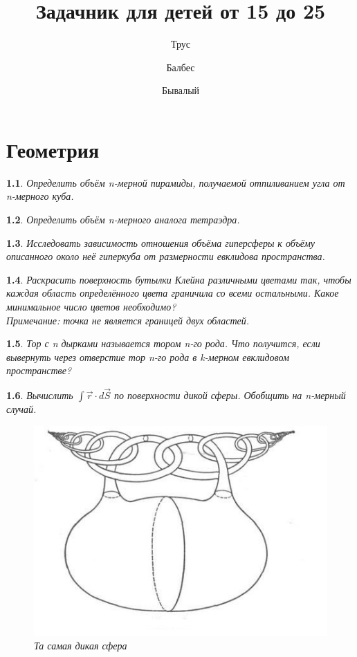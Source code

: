 \documentclass[a4paper]{book}
\author{Трус \and Балбес \and Бывалый}
\title{Задачник для детей от 15 до 25}
\theoremstyle{problemstyle}
\newtheorem{problem}{} %
\begin{document}
    \maketitle
    
    \tableofcontents
    \chapter{Геометрия}
    \begin{problem}
        Определить объём n-мерной пирамиды, получаемой отпиливанием угла от
        n-мерного куба.
    \end{problem}
    \begin{problem}
        Определить объём n-мерного аналога тетраэдра.
    \end{problem}
    \begin{problem}
        Исследовать зависимость отношения объёма гиперсферы к объёму описанного
        около неё гиперкуба от размерности евклидова пространства.
    \end{problem}
    \begin{problem}
        Раскрасить поверхность бутылки Клейна различными цветами так, чтобы
        каждая область определённого цвета граничила со всеми остальными.
        Какое минимальное число цветов необходимо?\\
        \textit{Примечание: точка не является границей двух областей.}
    \end{problem}
    \begin{problem}
        Тор с n дырками называется тором n-го рода. Что получится, если
        вывернуть через отверстие тор n-го рода в k-мерном евклидовом
        пространстве?
    \end{problem}
    \begin{problem}
        Вычислить \( \int \vec{r} \cdot d\vec{S} \) по поверхности дикой сферы.
        Обобщить на n-мерный случай.
        \begin{figure}[h]
            \centering
            \includegraphics[width=0.8\linewidth]{images/wild-sphere}
            \caption{Та самая дикая сфера}
            \label{fig:wild-sphere}
        \end{figure}
    \end{problem}
\end{document}
